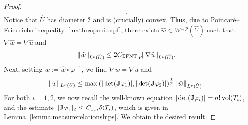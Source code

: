 \documentclass[10pt,a4paper]{article}
\begin{document}
\begin{proof}
\begin{align*}
        .
    \end{align*}
    Notice that $\hat U$ has diameter $2$ and is (crucially) convex. 
    Thus, due to Poincar\'e--Friedrichs inequality~\eqref{math:esposito:pf}, there exists $\hat w \in W^{1,p}(\hat U)$ such that $\nabla \hat w = \nabla \hat u$ and 
    \begin{align*}
        \| \hat w \|_{L^{p}(\hat U)}
        \leq 
        2 C_{{\rm EFNT},p}
        \| \nabla \hat u \|_{L^{p}(\hat U)}
        .
    \end{align*}
    Next, setting $w := \hat w \circ \varphi^{-1}$, we find $\nabla w = \nabla u$ and 
    \begin{align*}
        \| w \|_{L^{p}(U)}
        \leq 
        \max\left( 
            |\det({\mathbf{J}} \varphi_1)|
            ,
            |\det({\mathbf{J}} \varphi_2)|
        \right)^{\frac 1 p}
        \| \hat w \|_{L^{p}(\hat U)}
        .
    \end{align*}
    For both $i = 1,2$, we now recall the well-known equation $|\det({\mathbf{J}}\varphi_i)| = n! \operatorname{vol}(T_i)$, 
    and the estimate $\|  {\mathbf{J}} \varphi_i  \|_{2} \leq C_{1,n} {\delta}(T_i)$, which is given in Lemma~\ref{lemma:measurerelationships}. We obtain the desired result.
\begin{comment}
    Abbreviate $D := \max\left( \diam(T_1), \diam(T_2) \right)$. In combination, 
    \begin{align*}
        \| w \|_{L^{p}(U)}
        &\leq 
        2 C_{{\rm EFNT},p}
        \max\left( 
            |\det(\Jacobian \varphi_1)|
            ,
            |\det(\Jacobian \varphi_2)|
        \right)^{\frac 1 p}
        \\&\qquad 
        \max\left( 
            |\det(\Jacobian \varphi_1)|^{-\frac 1 p} 
            ,
            |\det(\Jacobian \varphi_2)|^{-\frac 1 p} 
        \right)
        D
        \| \nabla u \|_{L^{p}(U)}
        \\&
        \leq 
        2 C_{{\rm EFNT},p}
        \max\left( 
            |\det(\Jacobian \varphi_1)|
            ,
            |\det(\Jacobian \varphi_2)|
        \right)^{\frac 1 p}
        \\&\qquad 
        \min\left( 
            |\det(\Jacobian \varphi_1)|
            ,
            |\det(\Jacobian \varphi_2)| 
        \right)^{-\frac 1 p} 
        D
        \| \nabla u \|_{L^{p}(U)}
        \\&

\end{comment}
\end{proof}
\end{document}
